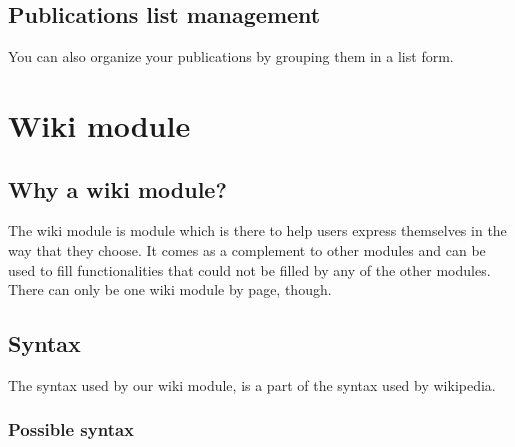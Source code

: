 \documentclass{article}
\begin{document}
\subsection{Publications list management}
You can also organize your publications by grouping them in a list form. 


\section{Wiki module}
\subsection{Why a wiki module?}
The wiki module is  module which is there to help users express themselves in the way that they choose. It comes as a complement to other modules and can be used to fill functionalities that could not be filled  by any of the other modules. There can only be one wiki module by page, though. 
\subsection{Syntax}
The syntax used by our wiki module, is a part of the syntax used by wikipedia.
\subsubsection{Possible syntax}
\end{document}

